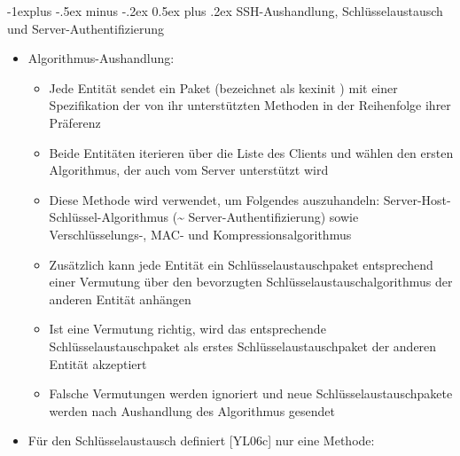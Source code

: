 \documentclass[a4paper]{article}
\makeatletter
\renewcommand{\subsection}{\@startsection{subsection}{2}{0mm}%
 {-1explus -.5ex minus -.2ex}%
 {0.5ex plus .2ex}%
 {\normalfont\normalsize\bfseries}}
\makeatother
\begin{document}
\begin{multicols}{3}
    \subsection{SSH-Aushandlung, Schlüsselaustausch und
        Server-Authentifizierung}

    \begin{itemize}
        \item
              Algorithmus-Aushandlung:

              \begin{itemize}
                  \item
                        Jede Entität sendet ein Paket (bezeichnet als kexinit ) mit einer
                        Spezifikation der von ihr unterstützten Methoden in der Reihenfolge
                        ihrer Präferenz
                  \item
                        Beide Entitäten iterieren über die Liste des Clients und wählen den
                        ersten Algorithmus, der auch vom Server unterstützt wird
                  \item
                        Diese Methode wird verwendet, um Folgendes auszuhandeln:
                        Server-Host-Schlüssel-Algorithmus (\textasciitilde{}
                        Server-Authentifizierung) sowie Verschlüsselungs-, MAC- und
                        Kompressionsalgorithmus
                  \item
                        Zusätzlich kann jede Entität ein Schlüsselaustauschpaket
                        entsprechend einer Vermutung über den bevorzugten
                        Schlüsselaustauschalgorithmus der anderen Entität anhängen
                  \item
                        Ist eine Vermutung richtig, wird das entsprechende
                        Schlüsselaustauschpaket als erstes Schlüsselaustauschpaket der
                        anderen Entität akzeptiert
                  \item
                        Falsche Vermutungen werden ignoriert und neue
                        Schlüsselaustauschpakete werden nach Aushandlung des Algorithmus
                        gesendet
              \end{itemize}
        \item
              Für den Schlüsselaustausch definiert {[}YL06c{]} nur eine Methode:


\end{itemize}
\end{multicols}
\end{document}
